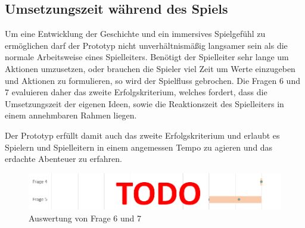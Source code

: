 \subsection{Umsetzungszeit während des Spiels}
\label{sec:Umsetzungszeit}
Um eine Entwicklung der Geschichte und ein immersives Spielgefühl zu ermöglichen darf der Prototyp nicht unverhältnismäßig langsamer sein als die normale Arbeitsweise eines Spielleiters. Benötigt der Spielleiter sehr lange um Aktionen umzusetzen, oder brauchen die Spieler viel Zeit um Werte einzugeben und Aktionen zu formulieren, so wird der Spielfluss gebrochen. Die Fragen 6 und 7 evaluieren daher das zweite Erfolgskriterium, welches fordert, dass die Umsetzungszeit der eigenen Ideen, sowie die Reaktionszeit des Spielleiters in einem annehmbaren Rahmen liegen.

Der Prototyp erfüllt damit auch das zweite Erfolgskriterium und erlaubt es Spielern und Spielleitern in einem angemessen Tempo zu agieren und das erdachte Abenteuer zu erfahren.

\begin{figure}
	\centering
		\includegraphics[width=1.00\textwidth]{media/2questions_temp.png}
	\caption{Auswertung von Frage 6 und 7}
	\label{fig:questions_6_7}
\end{figure}


